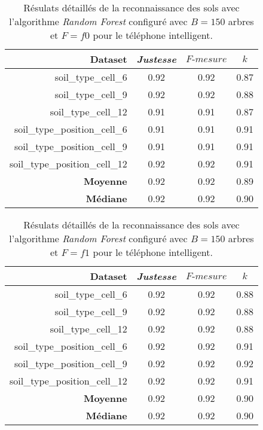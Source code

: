 \begin{table}[H]\renewcommand{\arraystretch}{0.5}
	\centering
	\caption{Résulats détaillés de la reconnaissance des sols avec l'algorithme \textit{Random Forest} configuré avec $B=150$ arbres et $F=f0$ pour le téléphone intelligent.}
	\label{tab:rf-150-f0-cell}
	\begin{tabular}{@{}rccc@{}}
		\toprule
			\textbf{Dataset} & \textit{Justesse} & $F\mbox{-} mesure$ & \textbf{$k$} \\
		\midrule
			soil\_type\_cell\_6 & 0.92 & 0.92 & 0.87 \\
			soil\_type\_cell\_9 & 0.92 & 0.92 & 0.88 \\
			soil\_type\_cell\_12 & 0.91 & 0.91 & 0.87 \\
			soil\_type\_position\_cell\_6 & 0.91 & 0.91 & 0.91 \\
			soil\_type\_position\_cell\_9 & 0.91 & 0.91 & 0.91 \\
			soil\_type\_position\_cell\_12 & 0.92 & 0.92 & 0.91 \\
			\textbf{Moyenne} & 0.92 & 0.92 & 0.89 \\
			\textbf{Médiane} & 0.92 & 0.92 & 0.90 \\
		\bottomrule
	\end{tabular}
\end{table}

\begin{table}[H]\renewcommand{\arraystretch}{0.5}
	\centering
	\caption{Résulats détaillés de la reconnaissance des sols avec l'algorithme \textit{Random Forest} configuré avec $B=150$ arbres et $F=f1$ pour le téléphone intelligent.}
	\label{tab:rf-150-f1-cell}
	\begin{tabular}{@{}rccc@{}}
		\toprule
			\textbf{Dataset} & \textit{Justesse} & $F\mbox{-} mesure$ & \textbf{$k$} \\
		\midrule
			soil\_type\_cell\_6 & 0.92 & 0.92 & 0.88 \\
			soil\_type\_cell\_9 & 0.92 & 0.92 & 0.88 \\
			soil\_type\_cell\_12 & 0.92 & 0.92 & 0.88 \\
			soil\_type\_position\_cell\_6 & 0.92 & 0.92 & 0.91 \\
			soil\_type\_position\_cell\_9 & 0.92 & 0.92 & 0.92 \\
			soil\_type\_position\_cell\_12 & 0.92 & 0.92 & 0.91 \\
			\textbf{Moyenne} & 0.92 & 0.92 & 0.90 \\
			\textbf{Médiane} & 0.92 & 0.92 & 0.90 \\
		\bottomrule
	\end{tabular}
\end{table}

